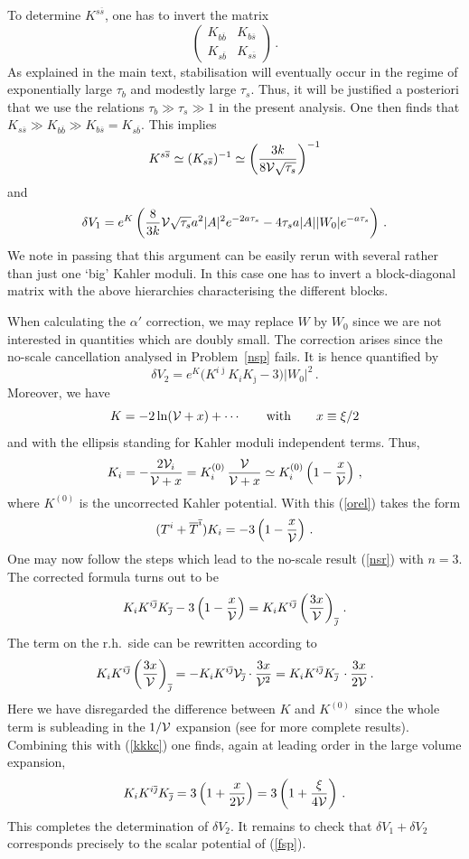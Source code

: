 \documentclass[12pt]{article}
\newcommand{\be}{\begin{equation}}
\newcommand{\ee}{\end{equation}}
\newcommand{\ol}{\overline}
\numberwithin{equation}{section}
\begin{document}
To determine $K^{s\ol{s}}$, one has to invert the matrix
\be
\left(
\begin{array}{cc}
K_{b\ol{b}} & K_{b\ol{s}}
\\
K_{s\ol{b}} & K_{s\ol{s}}
\end{array}
\right)\,.
\ee
As explained in the main text, stabilisation will eventually occur in the regime of exponentially large $\tau_b$ and modestly large $\tau_s$. Thus, it will be justified a posteriori that we use the relations $\tau_b\gg \tau_s\gg 1$ in the present analysis. One then finds that $K_{s\ol{s}}\gg K_{b\ol{b}} \gg
K_{b\ol{s}} = K_{s\ol{b}}$. This implies
\be
K^{s\ol{s}}\simeq (K_{s\ol{s}})^{-1}\simeq \left( \frac{3 k}{8 {\cal V}\sqrt{\tau_s}}
\right)^{-1}
\ee
and
\be
\delta V_1=e^K\left(\frac{8}{3k}{\cal V}\sqrt{\tau_s}a^2|A|^2 e^{-2a\tau_s} -4\tau_s a |A||W_0| e^{-a\tau_s}\right)\,.
\ee
We note in passing that this argument can be easily rerun with several rather than just one `big' Kahler moduli. In this case one has to invert a block-diagonal matrix with the above hierarchies characterising the different blocks.

When calculating the $\alpha'$ correction, we may replace $W$ by $W_0$ since we are not interested in quantities which are doubly small. The correction arises since the no-scale cancellation analysed in Problem~\ref{nsp} fails. It is hence quantified by
\be
\delta V_2=e^K\big( K^{i\ol{\jmath}}K_i K_{\ol{\jmath}}
-3 \big)|W_0|^2\,. \label{v2def}
\ee
Moreover, we have
\be
K=-2\ln({\cal V}+x)+\cdots \qquad \mbox{with}\qquad x\equiv \xi/2
\ee
and with the ellipsis standing for Kahler moduli independent terms. Thus,
\be
K_i=-\frac{2{\cal V}_i}{{\cal V}+x}=K_i^{(0)}\,\frac{\cal V}{{\cal V}+x}\simeq K_i^{(0)}\left(1-\frac{x}{\cal V}\right)\,,
\ee
where $K^{(0)}$ is the uncorrected Kahler potential. With this (\ref{orel}) takes the form
\be
(T^i+\ol{T}^{\ol{\imath}})K_i=-3\left(1-\frac{x}{\cal V}\right)\,.\ee
One may now follow the steps which lead to the no-scale result (\ref{nsr}) with $n=3$. The corrected formula turns out to be
\be
K_i K^{i\ol{\jmath}} K_{\ol{\jmath}} -3\left(1-\frac{x}{\cal V}\right) = K_i K^{i \ol{\jmath}}\left(\frac{3x}{\cal V}\right)_{\ol{\jmath}}\,. \label{kkkc}
\ee
The term on the r.h.~side can be rewritten according to
\be
K_i K^{i \ol{\jmath}}\left(\frac{3x}{\cal V}\right)_{\ol{\jmath}}
= - K_i K^{i \ol{\jmath}}{\cal V}_{\ol{\jmath}} \cdot \frac{3x}{{\cal V}^2} =K_i K^{i \ol{\jmath}} K_{\ol{\jmath}}
\,\cdot \frac{3x}{2 \cal V}\,.
\ee
Here we have disregarded the difference between $K$ and $K^{(0)}$ since the whole term is subleading in the $1/{\cal V}$ expansion (see \cite{Becker:2002nn} for more complete results). Combining this with (\ref{kkkc}) one finds, again at leading order in the large volume expansion,
\be
K_i K^{i\ol{\jmath}} K_{\ol{\jmath}}=3\left(1+\frac{x}{2 \cal V}\right) = 3\left(1+\frac{\xi}{4 \cal V}\right)\,.
\ee
This completes the determination of $\delta V_2$. It remains to check that $\delta V_1+\delta V_2$ corresponds precisely to the scalar potential of (\ref{fsp}).
\end{document}

